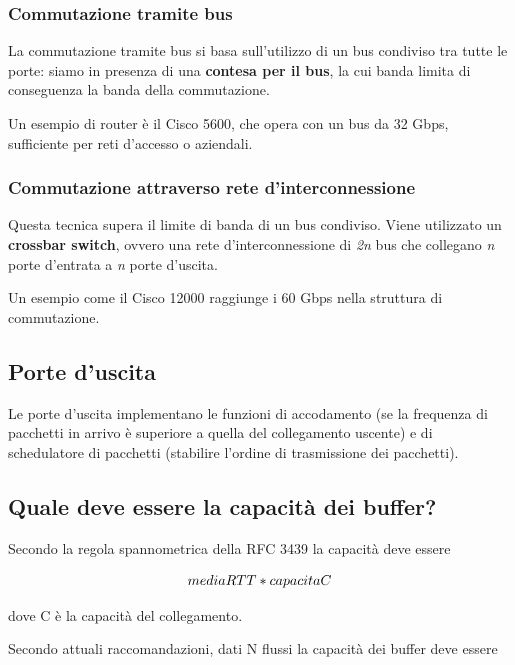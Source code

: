 \documentclass{report}
\begin{document}
\hypertarget{header-n72}{%
\subsubsection{Commutazione tramite bus}\label{header-n72}}

La commutazione tramite bus si basa sull'utilizzo di un bus condiviso
tra tutte le porte: siamo in presenza di una \textbf{contesa per il
bus}, la cui banda limita di conseguenza la banda della commutazione.

Un esempio di router è il Cisco 5600, che opera con un bus da 32 Gbps,
sufficiente per reti d'accesso o aziendali.

\hypertarget{header-n75}{%
\subsubsection{Commutazione attraverso rete
d'interconnessione}\label{header-n75}}

Questa tecnica supera il limite di banda di un bus condiviso. Viene
utilizzato un \textbf{crossbar switch}, ovvero una rete
d'interconnessione di \emph{2n} bus che collegano \emph{n} porte
d'entrata a \emph{n} porte d'uscita.

Un esempio come il Cisco 12000 raggiunge i 60 Gbps nella struttura di
commutazione.

\hypertarget{header-n78}{%
\subsection{Porte d'uscita}\label{header-n78}}

Le porte d'uscita implementano le funzioni di accodamento (se la
frequenza di pacchetti in arrivo è superiore a quella del collegamento
uscente) e di schedulatore di pacchetti (stabilire l'ordine di
trasmissione dei pacchetti).

\hypertarget{header-n80}{%
\subsection{Quale deve essere la capacità dei
buffer?}\label{header-n80}}

Secondo la regola spannometrica della RFC 3439 la capacità deve essere

\[media \space RTT \space*\space capacita \space C\]

dove C è la capacità del collegamento.

Secondo attuali raccomandazioni, dati N flussi la capacità dei buffer
deve essere
\end{document}
